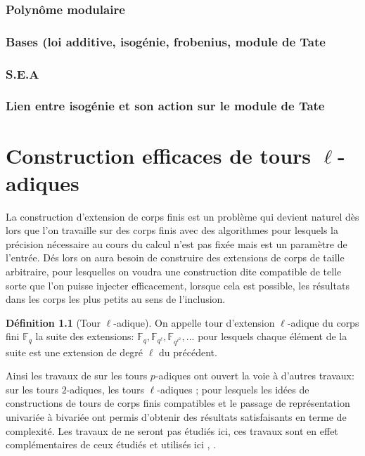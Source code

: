 \documentclass[10pt,a4paper]{book}
\theoremstyle{plain}
\theoremstyle{definition}
\theoremstyle{definition}
\theoremstyle{definition}
\theoremstyle{definition}
\newtheorem{defi}[thm]{Définition}
\theoremstyle{remark}
\theoremstyle{remark}
\begin{document}
\subsection{Polynôme modulaire}
\subsection{Bases (loi additive, isogénie, frobenius, module de Tate}
\subsection{S.E.A}
\subsection{Lien entre isogénie et son action sur le module de Tate}

\chapter{Construction efficaces de tours $\ell$-adiques}
La construction d'extension de corps finis est un problème qui devient naturel dès lors que l'on travaille sur des corps finis avec des algorithmes pour lesquels la précision nécessaire au cours du calcul n'est pas fixée mais est un paramètre de l'entrée. Dés lors on aura besoin de  construire des extensions de corps de taille arbitraire, pour lesquelles on voudra une construction dite compatible de telle sorte que l'on puisse injecter efficacement, lorsque cela est possible, les résultats dans les corps les plus petits au sens de l'inclusion.

\begin{defi}[Tour \textit{$\ell$}-adique]
\label{def:tour-ell}
On appelle tour d'extension $\ell$-adique du corps fini $\mathbb{F}_q$ la suite des extensions: $\mathbb{F}_q, \mathbb{F}_{q^{\ell}}, \mathbb{F}_{q^{\ell^2}}, ...$ pour lesquels chaque élément de la suite est une extension de degré $\ell$ du précédent.
\end{defi}


Ainsi les travaux de \cite{DeFeo-Shost'12} sur les tours $p$-adiques ont ouvert la voie à d'autres travaux:  sur les tours $2$-adiques\cite{Doliskani-Schost15}, les tours $\ell$-adiques\cite{DeFeo-Doliskani-Schost13} ; pour lesquels les idées de constructions de tours de corps finis compatibles et le passage de représentation univariée à bivariée ont permis d'obtenir des résultats satisfaisants en terme de complexité.
Les travaux de  \cite{DeFeo-Shost'12} ne seront pas étudiés ici, ces travaux sont en effet complémentaires de ceux étudiés et utilisés ici \cite{Doliskani-Schost15}, \cite{DeFeo-Doliskani-Schost13}.
\end{document}
